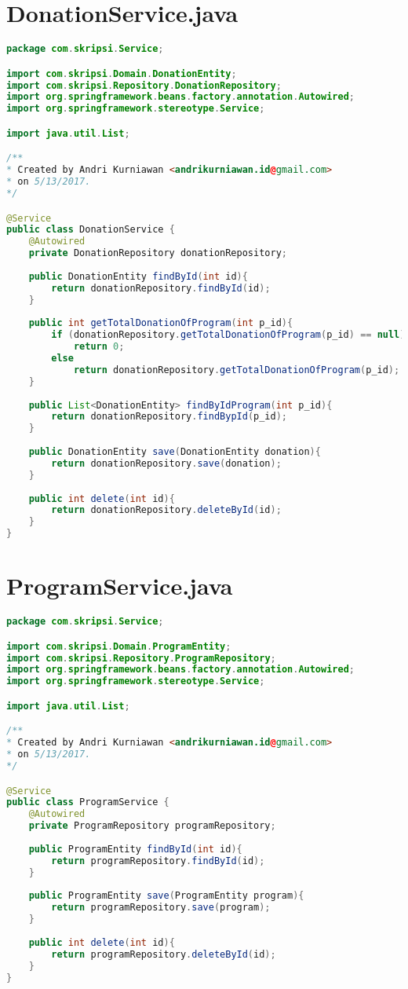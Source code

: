 \section*{DonationService.java}
\begin{lstlisting}[caption={Berkas DonationService.java},label={lst:DonationService},language=Java]
package com.skripsi.Service;

import com.skripsi.Domain.DonationEntity;
import com.skripsi.Repository.DonationRepository;
import org.springframework.beans.factory.annotation.Autowired;
import org.springframework.stereotype.Service;

import java.util.List;

/**
* Created by Andri Kurniawan <andrikurniawan.id@gmail.com>
* on 5/13/2017.
*/

@Service
public class DonationService {
	@Autowired
	private DonationRepository donationRepository;
	
	public DonationEntity findById(int id){
		return donationRepository.findById(id);
	}
	
	public int getTotalDonationOfProgram(int p_id){
		if (donationRepository.getTotalDonationOfProgram(p_id) == null)
			return 0;
		else
			return donationRepository.getTotalDonationOfProgram(p_id);
	}
	
	public List<DonationEntity> findByIdProgram(int p_id){
		return donationRepository.findBypId(p_id);
	}
	
	public DonationEntity save(DonationEntity donation){
		return donationRepository.save(donation);
	}
	
	public int delete(int id){
		return donationRepository.deleteById(id);
	}
}

\end{lstlisting}

\newpage
\section*{ProgramService.java}
\begin{lstlisting}[caption={Berkas ProgramService.java},label={lst:ProgramService},language=Java]
package com.skripsi.Service;

import com.skripsi.Domain.ProgramEntity;
import com.skripsi.Repository.ProgramRepository;
import org.springframework.beans.factory.annotation.Autowired;
import org.springframework.stereotype.Service;

import java.util.List;

/**
* Created by Andri Kurniawan <andrikurniawan.id@gmail.com>
* on 5/13/2017.
*/

@Service
public class ProgramService {
	@Autowired
	private ProgramRepository programRepository;
	
	public ProgramEntity findById(int id){
		return programRepository.findById(id);
	}
	
	public ProgramEntity save(ProgramEntity program){
		return programRepository.save(program);
	}
	
	public int delete(int id){
		return programRepository.deleteById(id);
	}
}

\end{lstlisting}